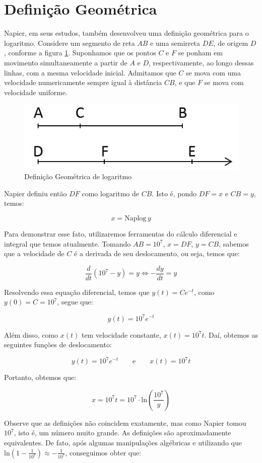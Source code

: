 \section{Definição Geométrica}

Napier, em seus estudos, também desenvolveu uma definição geométrica para o logaritmo. 
Considere um segmento de reta $AB$ e uma semirreta $DE$, de origem $D$, conforme a figura \ref{fig:defgeolog}. 
Suponhamos que os pontos $C$ e $F$ se ponham em movimento simultaneamente a partir de $A$ e $D$, respectivamente, 
ao longo dessas linhas, com a mesma velocidade inicial. 
Admitamos que $C$ se mova com uma velocidade numericamente sempre igual à distância $CB$, 
e que $F$ se mova com velocidade uniforme. 

\begin{figure}[h!]
    \centering
    \includegraphics[width=0.4\linewidth]{img/defgeo.png}
    \caption{Definição Geométrica de logaritmo}
    \label{fig:defgeolog}
\end{figure}

Napier definiu então $DF$ como logaritmo de $CB$. 
Isto é, pondo $DF = x$ e $CB = y$, temos:

\[
x = \text{Naplog}\, y
\]

Para demonstrar esse fato, utilizaremos ferramentas do cálculo diferencial e integral que temos atualmente. Tomando $AB = 10^7$, $x=DF$, $y = CB$, sabemos que a velocidade de $C$ é a derivada de seu deslocamento, ou seja, temos que:

\[
\dfrac{d}{dt}(10^7 - y) = y \iff -\dfrac{dy}{dt} = y
\]

Resolvendo essa equação diferencial, temos que $y(t) = Ce^{-t}$, como $y(0) = C = 10^7$, segue que:

\[
y(t) = 10^7 e^{-t}
\]

Além disso, como $x(t)$ tem velocidade constante, $x(t)= 10^7 t$. Daí, obtemos as seguintes funções de deslocamento:

\[
y(t) = 10^7 e^{-t} \qquad \text{e} \qquad x(t)= 10^7 t
\]

Portanto, obtemos que:

\[
x = 10^7 t = 10^7 \cdot \text{ln}\left(\frac{10^7}{y}\right)
\]

Observe que as definições não coincidem exatamente, mas como Napier tomou $10^7$, isto é, um número muito grande. As definições são aproximadamente equivalentes. De fato, após algumas manipulações algébricas e utilizando que $\text{ln}\left(1-\frac{1}{10^7}\right) \approx -\frac{1}{10^7}$, conseguimos obter que:

